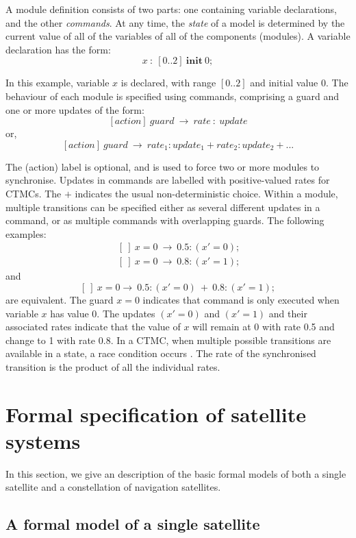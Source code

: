 \documentclass[preprint,12pt]{qrei}
\begin{document}
A module definition consists of two parts: one containing variable declarations, and the other {\it commands}. At any time, the {\it state} of a model is determined by the current value of all of the variables of all of the components (modules). A variable declaration has the form:
\[
x\ :\ [0..2]\ \textbf{init}\ 0;
\]

In this example, variable $x$ is declared, with range $[0..2]$ and initial value $0$. The behaviour of each module is specified using commands, comprising a guard and one or more updates of the form:
\[
[action]\ guard\ \rightarrow\ rate\ :\ update
\]
or,
\[
[action]\ guard\ \rightarrow\ rate_1:update_1+rate_2:update_2+...
\]

The (action) label is optional, and is used to force two or more modules to synchronise. Updates in commands are labelled with positive-valued rates \cite{KNP09} for CTMCs. The $+$ indicates the usual non-deterministic choice. Within a module, multiple transitions can be specified either as several different updates in a command, or as multiple commands with overlapping guards. The following examples:
\[
\begin{array}{l}
   \ [\ ]\ x=0\ \rightarrow\ 0.5:(x'=0);\\
   \ [\ ]\ x=0\ \rightarrow\ 0.8:(x'=1);
\end{array}
\]
and
\[
[\ ]\ x=0 \rightarrow\ 0.5:(x'=0)\ +\ 0.8:(x'=1);
\]
are equivalent. The guard $x=0$ indicates that command is only executed when variable $x$ has value 0. The updates $(x'=0)$ and $(x'=1)$ and their associated rates indicate that the value of $x$ will remain at 0 with rate 0.5 and change to 1 with rate 0.8. In a CTMC, when multiple possible transitions are available in a state, a race condition occurs \cite{KNP07}. The rate of the synchronised transition is the product of all the individual rates.




\section{Formal specification of satellite systems}\label{sect:fmc}

In this section, we give an description of the basic formal models of both a single satellite and a constellation of navigation satellites.

\subsection{A formal model of a single satellite}
\end{document}
